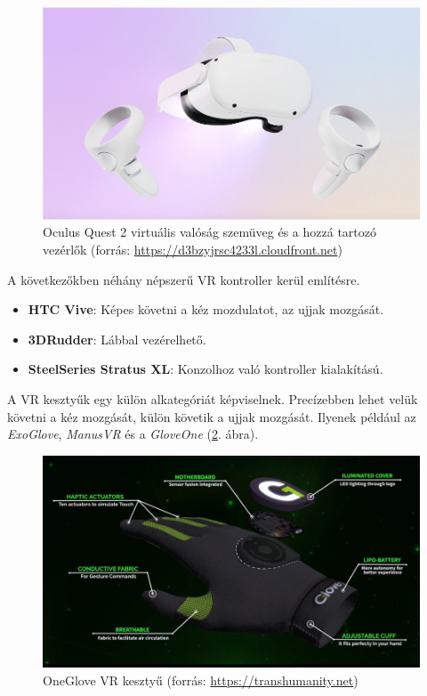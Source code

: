 \begin{figure}[htp]
    \centering
   	\includegraphics[scale=1]{images/oculus.png}
	\caption{Oculus Quest 2 virtuális valóság szemüveg és a hozzá tartozó vezérlők (forrás: \url{https://d3bzyjrsc4233l.cloudfront.net})}
	\label{fig:occulus}
\end{figure}

A következőkben néhány népszerű VR kontroller kerül említésre.
\begin{itemize}
\item \textbf{HTC Vive}: Képes követni a kéz mozdulatot, az ujjak mozgását.
\item \textbf{3DRudder}: Lábbal vezérelhető.
\item \textbf{SteelSeries Stratus XL}: Konzolhoz való kontroller kialakítású.
\end{itemize}

A VR kesztyűk egy külön alkategóriát képviselnek.
Precízebben lehet velük követni a kéz mozgását, külön követik a ujjak mozgását.
Ilyenek például az \textit{ExoGlove}, \textit{ManusVR} és a \textit{GloveOne} (\ref{fig:gloveone}. ábra).

\begin{figure}[htp]
    \centering
   	\includegraphics[scale=0.6]{images/gloveone.jpg}
	\caption{OneGlove VR kesztyű (forrás: \url{https://transhumanity.net})}
	\label{fig:gloveone}
\end{figure}

